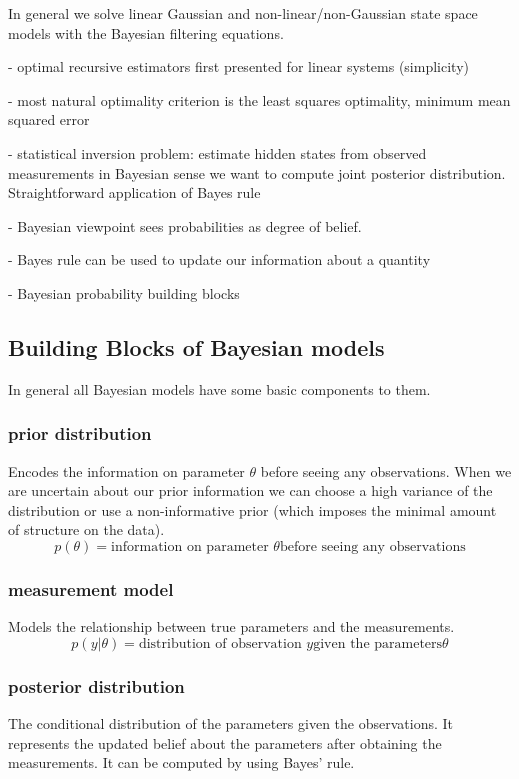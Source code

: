 In general we solve linear Gaussian and non-linear/non-Gaussian state space
models with the Bayesian filtering equations.

- optimal recursive estimators first presented for linear systems (simplicity)

- most natural optimality criterion is the least squares optimality,
minimum mean squared error

- statistical inversion problem: estimate hidden states from observed
measurements in Bayesian sense we want to compute joint posterior distribution.
Straightforward application of Bayes rule

- Bayesian viewpoint sees probabilities as degree of belief.

- Bayes rule can be used to update our information about a quantity

- Bayesian probability building blocks

\subsection{Building Blocks of Bayesian models}
In general all Bayesian models have some basic components to them.

\subsubsection{prior distribution}
Encodes the information on parameter $\theta$ before seeing any
observations. When we are uncertain about our prior information
we can choose a high variance of the distribution or use a
non-informative prior (which imposes the minimal amount of structure
on the data).
$$ p(\theta) = \text{information on parameter } \theta
\text{before seeing any observations} $$

\subsubsection{measurement model}
Models the relationship between true parameters and the measurements.
$$ p(y | \theta) = \text{distribution of observation } y
\text{given the parameters} \theta $$

\subsubsection{posterior distribution}
The conditional distribution of the parameters given the observations.
It represents the updated belief about the parameters
after obtaining the measurements. It can be computed by using Bayes' rule.

